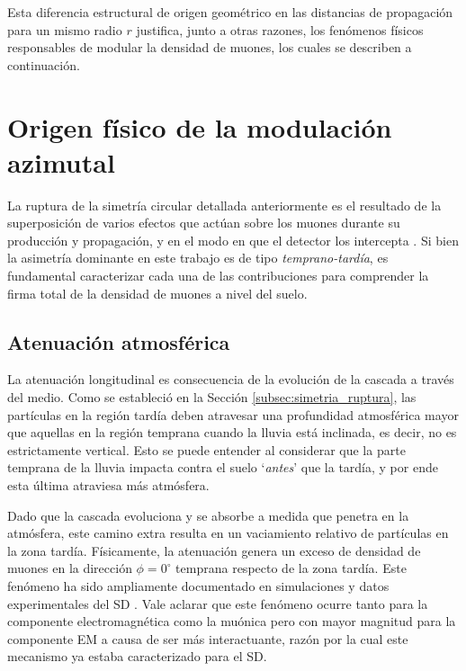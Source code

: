 Esta diferencia estructural de origen geométrico en las distancias de propagación para un mismo radio $r$ justifica, junto a otras razones, los fenómenos físicos responsables de modular la densidad de muones, los cuales se describen a continuación.

\section{Origen físico de la modulación azimutal}
\label{subsec:origen_fisico}

La ruptura de la simetría circular detallada anteriormente es el resultado de la superposición de varios efectos que actúan sobre los muones durante su producción y propagación, y en el modo en que el detector los intercepta \cite{GAP2000_017, Billoir2002, Armbruster2018}. Si bien la asimetría dominante en este trabajo es de tipo \textit{temprano-tardía}, es fundamental caracterizar cada una de las contribuciones para comprender la firma total de la densidad de muones a nivel del suelo.

\subsection{Atenuación atmosférica}
\label{subsubsec:atenuacion}

La atenuación longitudinal es consecuencia de la evolución de la cascada a través del medio. Como se estableció en la Sección \ref{subsec:simetria_ruptura}, las partículas en la región tardía deben atravesar una profundidad atmosférica mayor que aquellas en la región temprana cuando la lluvia está inclinada, es decir, no es estrictamente vertical. Esto se puede entender al considerar que la parte temprana de la lluvia impacta contra el suelo `\textit{antes}' que la tardía, y por ende esta última atraviesa más atmósfera.

Dado que la cascada evoluciona y se absorbe a medida que penetra en la atmósfera, este camino extra resulta en un vaciamiento relativo de partículas en la zona tardía. Físicamente, la atenuación genera un exceso de densidad de muones en la dirección $\phi = 0^\circ$ temprana respecto de la zona tardía. Este fenómeno ha sido ampliamente documentado en simulaciones y datos experimentales del SD \cite{Pryke1998, BradfieldThesis}. Vale aclarar que este fenómeno ocurre tanto para la componente electromagnética como la muónica pero con mayor magnitud para la componente EM a causa de ser más interactuante, razón por la cual este mecanismo ya estaba caracterizado para el SD.

